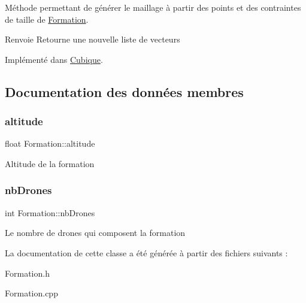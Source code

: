 Méthode permettant de générer le maillage à partir des points et des contraintes de taille de \mbox{\hyperlink{class_formation}{Formation}}. \begin{DoxyReturn}{Renvoie}
Retourne une nouvelle liste de vecteurs 
\end{DoxyReturn}


Implémenté dans \mbox{\hyperlink{class_cubique_ac7f56ed79d1732b2bf59e0456b3a2f6f}{Cubique}}.



\subsection{Documentation des données membres}
\mbox{\label{class_formation_a46ac97ac7c664d265c91a9ba3c718282}} 
\subsubsection{\texorpdfstring{altitude}{altitude}}
{\footnotesize\ttfamily float Formation\+::altitude\hspace{0.3cm}{\ttfamily [protected]}}

Altitude de la formation \mbox{\label{class_formation_a946670f42a19f84960990e9ffb781877}} 
\subsubsection{\texorpdfstring{nb\+Drones}{nbDrones}}
{\footnotesize\ttfamily int Formation\+::nb\+Drones\hspace{0.3cm}{\ttfamily [protected]}}

Le nombre de drones qui composent la formation 

La documentation de cette classe a été générée à partir des fichiers suivants \+:\begin{DoxyCompactItemize}
\item 
Formation.\+h\item 
Formation.\+cpp\end{DoxyCompactItemize}
